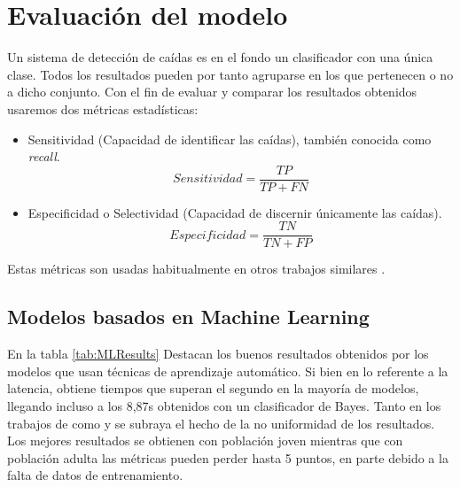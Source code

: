 \documentclass[../tfm.tex]{subfiles}
\begin{document}

\section{Evaluación del modelo}\label{eval_modelo}

Un sistema de detección de caídas es en el fondo un clasificador con una única clase. Todos los resultados pueden por tanto agruparse en los que pertenecen o no a dicho conjunto. Con el fin de evaluar y comparar los resultados obtenidos usaremos dos métricas estadísticas:
\begin{itemize}
  \item Sensitividad (Capacidad de identificar las caídas), también conocida como \textit{recall}.
  \[
    Sensitividad = \frac{TP}{TP+FN}
  \]
  \item Especificidad o Selectividad (Capacidad de discernir únicamente las caídas).
  \[
    Especificidad = \frac{TN}{TN+FP}
  \]
\end{itemize}

Estas métricas son usadas habitualmente en otros trabajos similares\cite{Noury2007,Chen2005, Bourke2006}
.



\subsection{Modelos basados en Machine Learning}

En la tabla \ref{tab:MLResults} Destacan los buenos resultados obtenidos por los modelos que usan técnicas de aprendizaje automático. Si bien en lo referente a la latencia, \cite{Liu2020} obtiene tiempos que superan el segundo en la mayoría de modelos, llegando incluso a los 8,87s obtenidos con un clasificador de Bayes. Tanto en los trabajos de \cite{Liu2020} como \cite{Musci2020} y \cite{Torti2018} se subraya el hecho de la no uniformidad de los resultados. Los mejores resultados se obtienen con población joven mientras que con población adulta las métricas pueden perder hasta 5 puntos, en parte debido a la falta de datos de entrenamiento.
\end{document}
